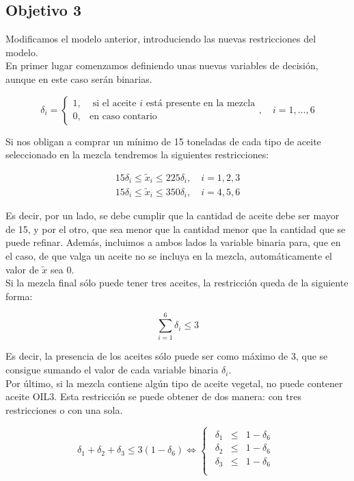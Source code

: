 \documentclass[12pt,a4paper,twoside,openright,titlepage,final]{article}
\begin{document}
\subsection{Objetivo 3}

Modificamos el modelo anterior, introduciendo las nuevas restricciones del modelo.\\

En primer lugar comenzamos definiendo unas nuevas variables de decisión, aunque en este caso serán binarias.

\[ \delta_i = \begin{cases}
1, & \text{ si el aceite } i \text{ está presente en la mezcla}\\
0, & \text{en caso contario}
\end{cases}, \quad i = 1,\dots,6 \]

Si nos obligan a comprar un mínimo de 15 toneladas de cada tipo de aceite seleccionado en la mezcla tendremos la siguientes restricciones:

\begin{align*}
15\delta_i \leq \tilde{x}_i \leq 225\delta_i, \quad i =1,2,3\\
15\delta_i \leq \tilde{x}_i \leq 350\delta_i, \quad i =4,5,6
\end{align*}

Es decir, por un lado, se debe cumplir que la cantidad de aceite debe ser mayor de 15, y por el otro, que sea menor que la cantidad menor que la cantidad que se puede refinar. Además, incluimos a ambos lados la variable binaria para, que en el caso, de que valga un aceite no se incluya en la mezcla, automáticamente el valor de $\tilde{x}$ sea 0.\\

Si la mezcla final sólo puede tener tres aceites, la restricción queda de la siguiente forma:

\[ \sum_{i=1}^{6} \delta_i \leq 3 \]

Es decir, la presencia de los aceites sólo puede ser como máximo de 3, que se consigue sumando el valor de cada variable binaria $\delta_i$.\\

Por último, si la mezcla contiene algún tipo de aceite vegetal, no puede contener aceite OIL3. Esta restricción se puede obtener de dos manera: con tres restricciones o con una sola.

\[ \delta_1 + \delta_2 + \delta_3 \leq 3(1-\delta_6) \iff \begin{cases}
\begin{array}{ccc}
\delta_1 & \leq & 1-\delta_6 \\
\delta_2 & \leq & 1-\delta_6 \\
\delta_3 & \leq & 1-\delta_6 \\
\end{array}
\end{cases} \]
\end{document}
